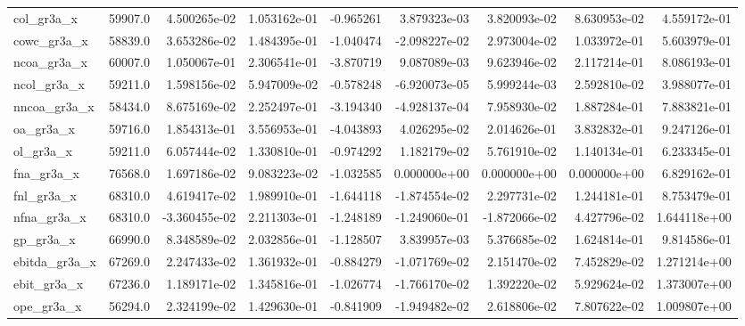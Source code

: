 \documentclass[10pt]{article}
\begin{document}
\begin{landscape}
\begin{longtable}{lrrrrrrrr}
col\_gr3a\_x              &   59907.0 &  4.500265e-02 &  1.053162e-01 &     -0.965261 &  3.879323e-03 &  3.820093e-02 &  8.630953e-02 &  4.559172e-01 \\
cowc\_gr3a\_x             &   58839.0 &  3.653286e-02 &  1.484395e-01 &     -1.040474 & -2.098227e-02 &  2.973004e-02 &  1.033972e-01 &  5.603979e-01 \\
ncoa\_gr3a\_x             &   60007.0 &  1.050067e-01 &  2.306541e-01 &     -3.870719 &  9.087089e-03 &  9.623946e-02 &  2.117214e-01 &  8.086193e-01 \\
ncol\_gr3a\_x             &   59211.0 &  1.598156e-02 &  5.947009e-02 &     -0.578248 & -6.920073e-05 &  5.999244e-03 &  2.592810e-02 &  3.988077e-01 \\
nncoa\_gr3a\_x            &   58434.0 &  8.675169e-02 &  2.252497e-01 &     -3.194340 & -4.928137e-04 &  7.958930e-02 &  1.887284e-01 &  7.883821e-01 \\
oa\_gr3a\_x               &   59716.0 &  1.854313e-01 &  3.556953e-01 &     -4.043893 &  4.026295e-02 &  2.014626e-01 &  3.832832e-01 &  9.247126e-01 \\
ol\_gr3a\_x               &   59211.0 &  6.057444e-02 &  1.330810e-01 &     -0.974292 &  1.182179e-02 &  5.761910e-02 &  1.140134e-01 &  6.233345e-01 \\
fna\_gr3a\_x              &   76568.0 &  1.697186e-02 &  9.083223e-02 &     -1.032585 &  0.000000e+00 &  0.000000e+00 &  0.000000e+00 &  6.829162e-01 \\
fnl\_gr3a\_x              &   68310.0 &  4.619417e-02 &  1.989910e-01 &     -1.644118 & -1.874554e-02 &  2.297731e-02 &  1.244181e-01 &  8.753479e-01 \\
nfna\_gr3a\_x             &   68310.0 & -3.360455e-02 &  2.211303e-01 &     -1.248189 & -1.249060e-01 & -1.872066e-02 &  4.427796e-02 &  1.644118e+00 \\
gp\_gr3a\_x               &   66990.0 &  8.348589e-02 &  2.032856e-01 &     -1.128507 &  3.839957e-03 &  5.376685e-02 &  1.624814e-01 &  9.814586e-01 \\
ebitda\_gr3a\_x           &   67269.0 &  2.247433e-02 &  1.361932e-01 &     -0.884279 & -1.071769e-02 &  2.151470e-02 &  7.452829e-02 &  1.271214e+00 \\
ebit\_gr3a\_x             &   67236.0 &  1.189171e-02 &  1.345816e-01 &     -1.026774 & -1.766170e-02 &  1.392220e-02 &  5.929624e-02 &  1.373007e+00 \\
ope\_gr3a\_x              &   56294.0 &  2.324199e-02 &  1.429630e-01 &     -0.841909 & -1.949482e-02 &  2.618806e-02 &  7.807622e-02 &  1.009807e+00 \\

\end{longtable}
\end{landscape}
\end{document}
